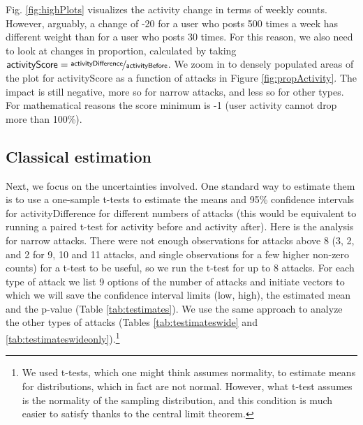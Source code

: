 \documentclass[a4paper,fleqn]{cas-dc}
\begin{document}
Fig. \ref{fig:highPlots} visualizes the activity change in terms of
weekly counts. However, arguably, a change of -20 for a user who posts
500 times a week has different weight than for a user who posts 30
times. For this reason, we also need to look at changes in proportion,
calculated by taking
\(\mathsf{activityScore} = \nicefrac{\mathsf{activityDifference}}{\mathsf{activityBefore}}\).
We zoom in to densely populated areas of the plot for
\textsf{activityScore} as a function of attacks in Figure
\ref{fig:propActivity}. The impact is still negative, more so for
\textsf{narrow} attacks, and less so for other types. For mathematical
reasons the score minimum is -1 (user activity cannot drop more than
100\%).




\subsection{Classical estimation}

Next, we focus on the uncertainties involved. One standard way to
estimate them is to use a one-sample t-tests to estimate the means and
95\% confidence intervals for \textsf{activityDifference} for different
numbers of attacks (this would be equivalent to running a paired t-test
for activity before and activity after). Here is the analysis for narrow
attacks. There were not enough observations for attacks above 8 (3, 2,
and 2 for 9, 10 and 11 attacks, and single observations for a few higher
non-zero counts) for a t-test to be useful, so we run the t-test for up
to 8 attacks. For each type of attack we list 9 options of the number of
attacks and initiate vectors to which we will save the confidence
interval limits (\textsf{low}, \textsf{high}), the estimated mean and
the \textsf{p}-value (Table \ref{tab:testimates}). We use the same
approach to analyze the other types of attacks (Tables
\ref{tab:testimateswide} and
\ref{tab:testimateswideonly}).\footnote{We used t-tests, which one might think assumes normality, to estimate means  for distributions, which in fact  are not normal. However, what t-test assumes is the normality of the sampling distribution, and this condition is much easier to satisfy thanks to the central limit theorem.}
\end{document}

